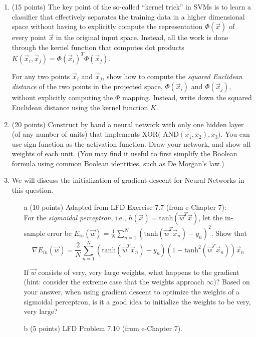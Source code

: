 \documentclass[11pt]{article}
\begin{document}
\begin{enumerate}
\item (15 points)
The key point of the so-called ``kernel trick'' in SVMs is to learn a classifier that effectively separates the training data in a higher dimensional space without having to explicitly compute the representation $\Phi(\vec{x})$ of every point $\vec{x}$ in the original input space. Instead, all the work is done through the kernel function that computes dot products  $K(\vec{x}_i, \vec{x}_j) = \Phi(\vec{x}_i)^T \Phi(\vec{x}_j)$.

\vspace{8pt}
For any two points $\vec{x}_i$ and $\vec{x}_j$, 
show how to compute the \emph{squared Euclidean distance} of the two points in the projected space, $\Phi(\vec{x}_i)$ and $\Phi(\vec{x}_j)$, without explicitly computing the $\Phi$ mapping. 
Instead, write down the squared Euclidean distance using the kernel function $K$.


\item (20 points) Construct by hand a neural network with only one hidden layer (of any number of units) 
that implements XOR$($ AND$(x_1,x_2), x_3 )$.  You can use sign function as the activation function.
Draw your network, and show all weights of each unit.
(You may find it useful to first simplify the Boolean formula using common Boolean identities, such as De Morgan's law.)

\item We will discuss the initialization of gradient descent for Neural Networks in this question.
\begin{itemize}
    \item [a] (10 points) Adapted from LFD Exercise 7.7 (from e-Chapter 7): \\
    For the \emph{sigmoidal perceptron}, i.e., $h(\vec{x})=\textrm{tanh}(\vec{w}^T\vec{x})$, 
    let the in-sample error be $E_{in}(\vec{w})=\frac{1}{N}\sum_{n=1}^N(\textrm{tanh}(\vec{w}^T\vec{x}_n)-y_n)^2$.
    Show that 
    \[
        \nabla E_{in}(\vec{w})=\frac{2}{N}\sum_{n=1}^N(\textrm{tanh}(\vec{w}^T\vec{x}_n)-y_n)(1-\textrm{tanh}^2(\vec{w}^T\vec{x}_n))\vec{x}_n 
    \]

    If $\vec{w}$ consists of very, very large weights, what happens to the gradient (hint: consider the extreme case that the weights approach $\infty$)? 
    Based on your answer, 
    when using gradient descent to optimize the weights of a sigmoidal perceptron, 
    is it a good idea to initialize the weights to be very, very large?
    \item [b] (5 points) LFD Problem 7.10 (from e-Chapter 7).
\end{itemize}

\end{enumerate}
\end{document}
